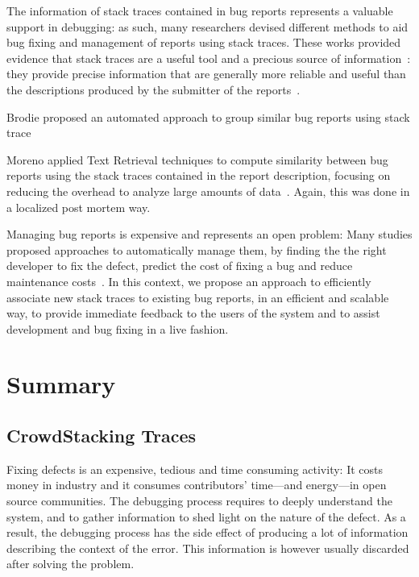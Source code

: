 The information of stack traces contained in bug reports represents a valuable support in debugging: as such, many researchers devised different methods to aid bug fixing and management of reports using stack traces.
These works provided evidence that stack traces are a useful tool and a precious source of information~\cite{Davie2013,Wang2013,Brod2005,Weiss2007a}: they provide precise information that are generally more reliable and useful than the descriptions produced by the submitter of the reports~\cite{Ko2006}.

Brodie \etal proposed an automated approach to group similar bug reports using stack trace~\cite{Brod2005}

Moreno \etal applied Text Retrieval techniques to compute similarity between bug reports using the stack traces contained in the report description, focusing on reducing the overhead to analyze large amounts of data~\cite{Moreno2014}.
Again, this was done in a localized post mortem way.

Managing bug reports is expensive and represents an open problem: Many studies proposed approaches to automatically manage them, by finding the the right developer to fix the defect, predict the cost of fixing a bug and reduce maintenance costs~\cite{Matt2009,Anvik2006a,Sliw2005,DAmb2010c}.
In this context, we propose an approach to efficiently associate new stack traces to existing bug reports, in an efficient and scalable way, to provide immediate feedback to the users of the system and to assist development and bug fixing in a live fashion.



\section{Summary}\label{sec:stacktraces-summary}

\subsection{CrowdStacking Traces}

Fixing defects is an expensive, tedious and time consuming activity: It costs money in industry and it consumes contributors' time---and energy---in open source communities.
The debugging process requires to deeply understand the system, and to gather information to shed light on the nature of the defect.
As a result, the debugging process has the side effect of producing a lot of information describing the context of the error.
This information is however usually discarded after solving the problem.

